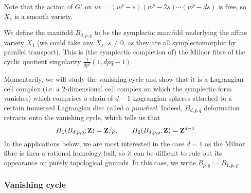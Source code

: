 \documentclass{article}
\begin{document}
\begin{Remark}
Note that the action of \(G'\) on
\(uv=(w^p-s)(w^p-2s)\cdots(w^p-ds)\) is free, so \(X_s\) is a smooth
variety.


\end{Remark}
\begin{Definition}
We define the manifold \(B_{d,p,q}\) to be the symplectic manifold
underlying the affine variety \(X_1\) (we could take any \(X_s\),
\(s\neq 0\), as they are all symplectomorphic by parallel
transport). This is (the symplectic completion of) the Milnor fibre
of the cyclic quotient singularity \(\frac{1}{dp^2}(1,dpq-1)\).


\end{Definition}
\begin{Remark}
Momentarily, we will study the vanishing cycle and show that it is a
Lagrangian cell complex (i.e. a 2-dimensional cell complex on which
the symplectic form vanishes) which comprises a chain of \(d-1\)
Lagrangian spheres attached to a certain immersed Lagrangian disc
called a {\em pinwheel}. Indeed, \(B_{d,p,q}\) deformation retracts
onto the vanishing cycle, which tells us that
\[H_1(B_{d,p,q};\mathbf{Z})=\mathbf{Z}/p,\qquad H_2(B_{d,p,q};\mathbf{Z})=\mathbf{Z}^{d-1}.\] In
the applications below, we are most interested in the case \(d=1\)
as the Milnor fibre is then a rational homology ball, so it can be
difficult to rule out its appearance on purely topological
grounds. In this case, we write \(B_{p,q}:=B_{1,p,q}\).


\end{Remark}
\subsubsection{Vanishing cycle}
\end{document}
